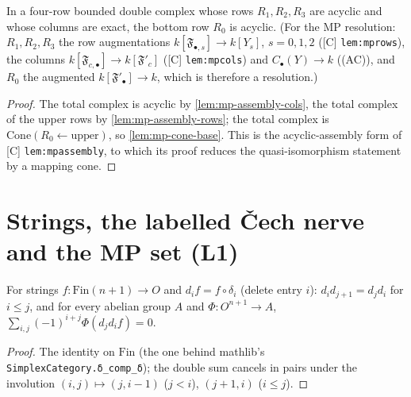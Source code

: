 \begin{theorem}\label{thm:mp-assembly-grid}
  \leanok
  In a four-row bounded double complex whose rows $R_1,R_2,R_3$ are acyclic and whose columns are exact, the bottom row $R_0$ is
  acyclic.  (For the MP resolution: $R_1,R_2,R_3$ the row augmentations $k[\mathfrak F_{\bullet,s}]\to k[Y_s]$, $s=0,1,2$
  ([C] \texttt{lem:mprows}), the columns $k[\mathfrak F_{c,\bullet}]\to k[\mathfrak F'_c]$ ([C] \texttt{lem:mpcols}) and
  $C_\bullet(Y)\to k$ ((AC)), and $R_0$ the augmented $k[\mathfrak F'_\bullet]\to k$, which is therefore a resolution.)
\end{theorem}
\begin{proof}
  \leanok
  The total complex is acyclic by \ref{lem:mp-assembly-cols}, the total complex of the upper rows by \ref{lem:mp-assembly-rows};
  the total complex is $\mathrm{Cone}(R_0\leftarrow\text{upper})$, so \ref{lem:mp-cone-base}.  This is the acyclic-assembly form of
  [C] \texttt{lem:mpassembly}, to which its proof reduces the quasi-isomorphism statement by a mapping cone.
\end{proof}

\section{Strings, the labelled Čech nerve and the MP set (L1)}

\begin{lemma}[Deletions: the first simplicial identity and $d\circ d=0$]\label{lem:mp-del}
  \leanok
  For strings $f\colon\mathrm{Fin}(n+1)\to O$ and $d_if=f\circ\delta_i$ (delete entry $i$): $d_id_{j+1}=d_jd_i$ for $i\le j$, and for every
  abelian group $A$ and $\Phi\colon O^{n+1}\to A$, $\sum_{i,j}(-1)^{i+j}\Phi(d_jd_if)=0$.
\end{lemma}
\begin{proof}
  \leanok
  The identity on $\mathrm{Fin}$ (the one behind mathlib's \texttt{SimplexCategory.δ\_comp\_δ}); the double sum cancels in pairs under
  the involution $(i,j)\mapsto(j,i-1)$ ($j<i$), $(j+1,i)$ ($i\le j$).
\end{proof}

